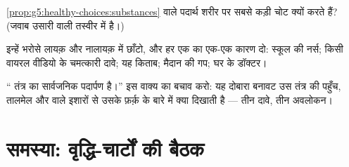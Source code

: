 \begin{exercise}[$\star\star$]\label{exo:g8:puberty:10}
\cref{prop:g5:healthy-choices:substances} वाले पदार्थ  शरीर पर
सबसे कड़ी चोट क्यों करते हैं? (जवाब उसारी वाली तस्वीर में है।)
\end{exercise}

\begin{exercise}[$\star\star$]\label{exo:g8:puberty:11}
इन्हें भरोसे लायक़ और नालायक़ में छाँटो, और हर एक का एक-एक कारण दो:
स्कूल की नर्स; किसी वायरल वीडियो के चमत्कारी दावे; यह किताब; मैदान की
गप; घर के डॉक्टर।
\end{exercise}

\begin{exercise}[$\star\star\star$]\label{exo:g8:puberty:12}
``  तंत्र का सार्वजनिक पदार्पण है।'' इस वाक्य का बचाव
करो: यह दोबारा बनावट उस तंत्र की पहुँच, तालमेल और  वाले इशारों
से उसके फ़र्क़ के बारे में क्या दिखाती है --- तीन दावे, तीन अवलोकन।
\end{exercise}

\section{समस्या: वृद्धि-चार्टों की बैठक}

